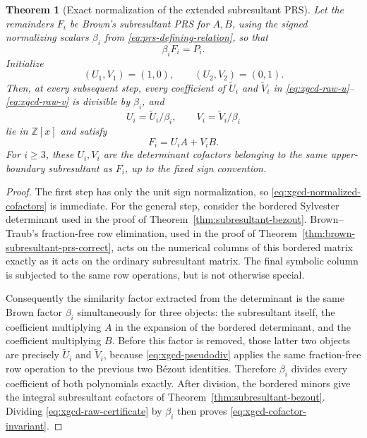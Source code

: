 \documentclass[11pt]{book}
\newtheorem{theorem}{Theorem}[section]
\theoremstyle{definition}
\newcommand{\ZZ}{\mathbb Z}
\begin{document}
\begin{theorem}[Exact normalization of the extended subresultant PRS]
\label{thm:xgcd-exact-cofactor-normalization}
Let the remainders $F_i$ be Brown's subresultant PRS for $A,B$, using the
signed normalizing scalars $\beta_i$ from
\eqref{eq:prs-defining-relation}, so that
\[
 \beta_iF_i=P_i.
\]
Initialize
\[
 (U_1,V_1)=(1,0),
 \qquad
 (U_2,V_2)=(0,1).
\]
Then, at every subsequent step, every coefficient of
$\widetilde U_i$ and $\widetilde V_i$ in
\eqref{eq:xgcd-raw-u}--\eqref{eq:xgcd-raw-v} is divisible by $\beta_i$, and
\begin{equation}\label{eq:xgcd-normalized-cofactors}
 U_i=\widetilde U_i/\beta_i,
 \qquad
 V_i=\widetilde V_i/\beta_i
\end{equation}
lie in $\ZZ[x]$ and satisfy
\begin{equation}\label{eq:xgcd-cofactor-invariant}
 F_i=U_iA+V_iB.
\end{equation}
For $i\ge3$, these $U_i,V_i$ are the determinant cofactors belonging to the
same upper-boundary subresultant as $F_i$, up to the fixed sign convention.
\end{theorem}

\begin{proof}
The first step has only the unit sign normalization, so
\eqref{eq:xgcd-normalized-cofactors} is immediate.  For the general step,
consider the bordered Sylvester determinant used in the proof of
Theorem~\ref{thm:subresultant-bezout}.  Brown--Traub's fraction-free row
elimination, used in the proof of
Theorem~\ref{thm:brown-subresultant-prs-correct}, acts on the numerical
columns of this bordered matrix exactly as it acts on the ordinary
subresultant matrix.  The final symbolic column is subjected to the same row
operations, but is not otherwise special.

Consequently the similarity factor extracted from the determinant is the
same Brown factor $\beta_i$ simultaneously for three objects: the
subresultant itself, the coefficient multiplying $A$ in the expansion of the
bordered determinant, and the coefficient multiplying $B$.  Before this
factor is removed, those latter two objects are precisely
$\widetilde U_i$ and $\widetilde V_i$, because
\eqref{eq:xgcd-pseudodiv} applies the same fraction-free row operation to the
previous two B\'ezout identities.  Therefore $\beta_i$ divides every
coefficient of both polynomials exactly.  After division, the bordered
minors give the integral subresultant cofactors of
Theorem~\ref{thm:subresultant-bezout}.  Dividing
\eqref{eq:xgcd-raw-certificate} by $\beta_i$ then proves
\eqref{eq:xgcd-cofactor-invariant}.
\end{proof}
\end{document}

